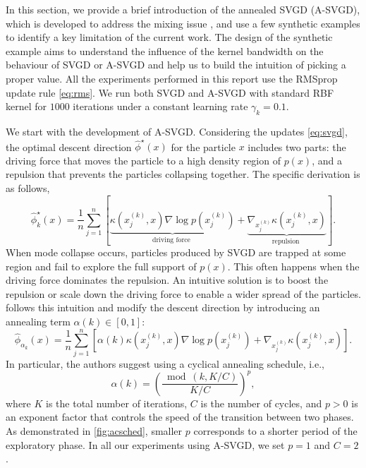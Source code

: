 In this section, we provide a brief introduction of the annealed SVGD (A-SVGD), which is developed to address the mixing issue \citep{d2021annealed}, and use a few synthetic examples to identify a key limitation of the current work. The design of the synthetic example aims to  understand the influence of the kernel bandwidth on the behaviour of SVGD or A-SVGD and help us to build the intuition of picking a proper value. All the experiments performed in this report use the RMSprop update rule \cref{eq:rms}. We run both SVGD and A-SVGD with standard RBF kernel for $1000$ iterations under a constant learning rate $\gamma_k = 0.1$. 



We start with the development of A-SVGD. Considering the updates \cref{eq:svgd}, the optimal descent direction $ \hat{\phi}^{\star}(x)$ for the particle $x$ includes two parts: the driving force that moves the particle to a high density region of $p(x)$, and a repulsion that prevents the particles collapsing together. The specific derivation is as follows,
\[
    \hat{\phi}_k^{\star}(x)=\frac{1}{n} \sum_{j=1}^{n}\left[\underbrace{\kappa\left(x_{j}^{(k)}, x\right) \nabla \log p\left(x_{j}^{(k)}\right)}_{\text {driving force }}+\underbrace{\nabla_{x_{j}^{(k)}} \kappa\left(x_{j}^{(k)}, x\right)}_{\text {repulsion }}\right].
\]
When mode collapse occurs, particles produced by SVGD are trapped at some region and fail to explore the full support of $p(x)$. This often happens when the driving force dominates the repulsion. An intuitive solution is to boost the repulsion or scale down the driving force to enable a wider spread of the particles. 
\citet{d2021annealed} follows this intuition and modify the descent direction by introducing an annealing term $\alpha(k) \in [0, 1]$:
\[\label{eq:asvgd}
    \hat{\phi}_{\alpha_k}\left(x\right) = \frac{1}{n} \sum_{j=1}^{n}\left[ \alpha(k)\kappa\left(x_{j}^{(k)}, x\right) \nabla \log p\left(x_{j}^{(k)}\right)+ \nabla_{x_{j}^{(k)}} \kappa\left(x_{j}^{(k)}, x\right)\right].
\]
In particular, the authors suggest using a cyclical annealing schedule, i.e., 
\[
    \alpha(k)=\left(\frac{\bmod (k, K / C)}{K / C}\right)^{p},
\]
where $K$ is the total number of iterations, $C$ is the number of cycles, and $p > 0$ is an exponent factor that controls the speed of the transition between two phases. As demonstrated in \cref{fig:acsched}, smaller $p$ corresponds to a shorter period of the exploratory phase.  In all our experiments using A-SVGD, we set $ p = 1$ and $C = 2$.

